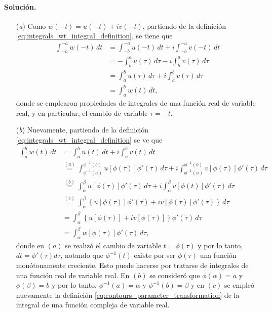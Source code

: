 \documentclass[a4paper]{report}
\begin{document}
\paragraph{Solución.} 
\begin{enumerate}
 \item[(\textit{a})] Como \(w(-t)=u(-t)+iv(-t)\), partiendo de la definición \ref{eq:integrals_wt_integral_definition}, se tiene que 
 \begin{align*}
  \int_{-b}^{-a}w(-t)\,dt&=\int_{-b}^{-a}u(-t)\,dt+i\int_{-b}^{-a}v(-t)\,dt\\
    &=-\int_{b}^{a}u(\tau)\,d\tau-i\int_{b}^{a}v(\tau)\,d\tau\\
    &=\int_{a}^{b}u(\tau)\,d\tau+i\int_{a}^{b}v(\tau)\,d\tau\\
    &=\int_{a}^{b}w(t)\,dt,
 \end{align*}
 donde se emplearon propiedades de integrales de una función real de variable real, y en particular, el cambio de variable \(\tau=-t\).
 \item[(\textit{b})] Nuevamente, partiendo de la definición \ref{eq:integrals_wt_integral_definition} se ve que 
 \begin{align*}
  \int_{a}^{b}w(t)\,dt&=\int_{a}^{b}u(t)\,dt+i\int_{a}^{b}v(t)\,dt\\
   &\overset{(a)}{=}\int_{\phi^{-1}(a)}^{\phi^{-1}(b)}u[\phi(\tau)]\phi'(\tau)\,d\tau+i\int_{\phi^{-1}(a)}^{\phi^{-1}(b)}v[\phi(\tau)]\phi'(\tau)\,d\tau\\
   &\overset{(b)}{=}\int_\alpha^\beta u[\phi(\tau)]\phi'(\tau)\,d\tau+i\int_\alpha^\beta v[\phi(t)]\phi'(\tau)\,d\tau\\
   &\overset{(c)}{=}\int_\alpha^\beta\left\{u[\phi(\tau)]\phi'(\tau)+iv[\phi(\tau)]\phi'(\tau)\right\}\,d\tau\\
   &=\int_\alpha^\beta\left\{u[\phi(\tau)]+iv[\phi(\tau)]\right\}\phi'(\tau)\,d\tau\\
   &=\int_\alpha^\beta w[\phi(\tau)]\phi'(\tau)\,d\tau,
 \end{align*}
 donde en \((a)\) se realizó el cambio de variable \(t=\phi(\tau)\) y por lo tanto, \(dt=\phi'(\tau)d\tau\), notando que \(\phi^{-1}(t)\) existe por ser \(\phi(\tau)\) una función monótonamente creciente. Esto puede hacerse por tratarse de integrales de una función real de variable real. En \((b)\) se consideró que \(\phi(\alpha)=a\) y \(\phi(\beta)=b\) y por lo tanto, \(\phi^{-1}(a)=\alpha\) y \(\phi^{-1}(b)=\beta\) y en \((c)\) se empleó nuevamente la definición \ref{eq:contours_parameter_transformation} de la integral de una función compleja de variable real.
\end{enumerate}
\end{document}
